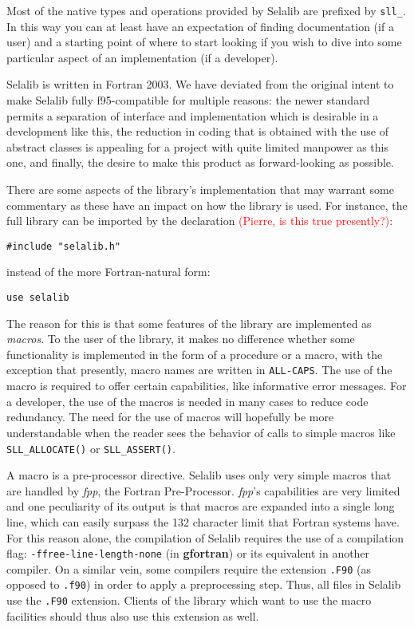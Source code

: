 \documentclass[]{report}   %
\begin{document}
Most of the native types and operations provided by Selalib are prefixed by \verb+sll_+. In this way you can at least have an expectation of finding documentation (if a user) and a starting point of where to start looking if you wish to dive into some particular aspect of an implementation (if a developer). 

Selalib is written in Fortran 2003. We have deviated from the original intent to make Selalib fully f95-compatible for multiple reasons: the newer standard permits a separation of interface and implementation which is desirable in a development like this, the reduction in coding that is obtained with the use of abstract classes is appealing for a project with quite limited manpower as this one, and finally, the desire to make this product as forward-looking as possible.

There are some aspects of the library's implementation that may warrant some commentary as these have an impact on how the library is used. For instance, the full library can be imported by the declaration \textcolor{red}{(Pierre, is this true presently?)}:
\begin{verbatim}
#include "selalib.h"
\end{verbatim}
instead of the more Fortran-natural form:
\begin{verbatim}
use selalib
\end{verbatim}
The reason for this is that some features of the library are implemented as \emph{macros}. To the user of the library, it makes no difference whether some functionality is implemented in the form of a procedure or a macro, with the exception that presently, macro names are written in \verb+ALL-CAPS+. The use of the macro is required to offer certain capabilities, like informative error messages. For a developer, the use of the macros is needed in many cases to reduce code redundancy. The need for the use of macros will hopefully be more understandable when the reader sees the behavior of calls to simple macros like \verb+SLL_ALLOCATE()+ or \verb+SLL_ASSERT()+.

A macro is a pre-processor directive. Selalib uses only very simple macros that are handled by \emph{fpp}, the Fortran Pre-Processor. \emph{fpp}'s capabilities are very limited and one peculiarity of its output is that macros are expanded into a single long line, which can easily surpass the 132 character limit that Fortran systems have. For this reason alone, the compilation of Selalib requires the use of a compilation flag: \verb+-ffree-line-length-none+ (in \textbf{gfortran}) or its equivalent in another compiler. On a similar vein, some compilers require the extension \verb+.F90+ (as opposed to \verb+.f90+) in order to apply a preprocessing step. Thus, all files in Selalib use the \verb+.F90+ extension. Clients of the library which want to use the macro facilities should thus also use this extension as well.
\end{document}

